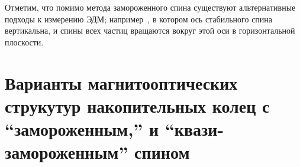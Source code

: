 Отметим, что помимо метода замороженного спина существуют альтернативные подходы к измерению ЭДМ; например~\cite{COSY:SpinTuneMapping, COSY:Partially-Frozen-Spin}, в котором ось стабильного спина вертикальна, 
и спины всех частиц вращаются вокруг этой оси в горизонтальной плоскости.



\section{Варианты магнитооптических струкутур накопительных колец с ``замороженным,'' и ``квази-замороженным'' спином} \label{chpt1:Lattices}



\clearpage